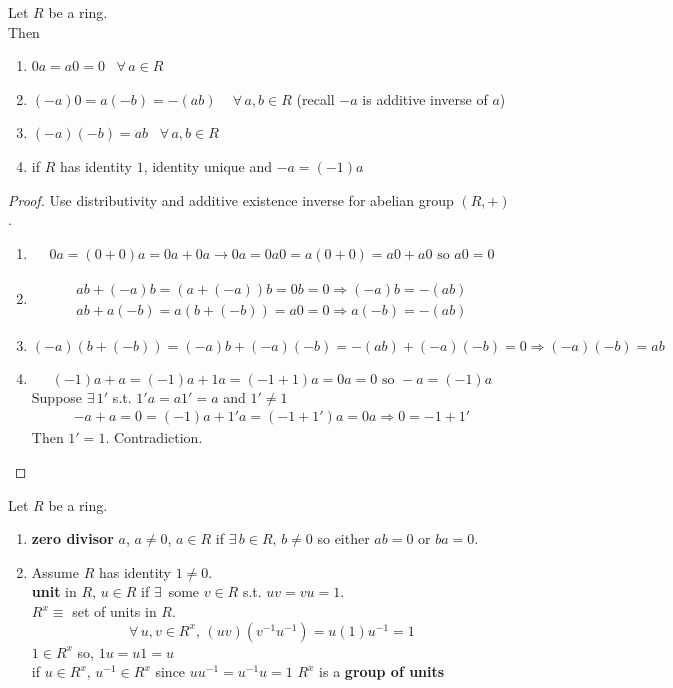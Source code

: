 \begin{proposition}
Let $R$ be a ring. \\
Then
\begin{enumerate}
	\item $0a = a0 = 0$ \, $\forall \, a \in R$ 
	\item $(-a) 0 = a(-b) = -(ab) \quad \, \forall \, a,b \in R$ (recall $-a$ is additive inverse of $a$)
	\item $(-a)(-b) =ab$ \quad \, $\forall \, a, b \in R$ 
	\item if $R$ has identity $1$, identity unique and $-a = (-1) a$
\end{enumerate}
\end{proposition}

\begin{proof}
Use distributivity and additive existence inverse for abelian group $(R, +)$. 

\begin{enumerate}
	\item \[
	\begin{gathered}
	0a = (0 + 0) a = 0a + 0a \to 0a = 0 
	a0 = a(0 + 0) = a0 + a0 \text{ so } a0 = 0 	
	\end{gathered}
	\]
	\item 
	\[
	\begin{gathered} 
	ab + (-a)b = (a + (-a)) b = 0b = 0 \Longrightarrow (-a) b = -(ab) \\
	ab + a(-b) = a(b + (-b)) = a0 = 0 \Longrightarrow a(-b) = -(ab) 	
	\end{gathered} 
	\]
	\item \[
	(-a)(b + (-b)) = (-a)b + (-a)(-b) = -(ab) + (-a)(-b) = 0 \Longrightarrow (-a)(-b) =ab
	\]
	\item \[
	(-1)a  + a = (-1) a + 1a = (-1 + 1) a = 0a = 0 \text{ so } -a = (-1) a
	\]
	Suppose $\exists \, 1'$ s.t. $1' a = a1' = a$ and $1' \neq 1$  
	\[
	\begin{gathered}
	-a + a = 0 = (-1) a + 1' a = (-1 + 1') a = 0 a \Longrightarrow 0 = -1 + 1' 
	\end{gathered}
	\]
	Then $1' = 1$. Contradiction. 
\end{enumerate}
\end{proof}

\begin{definition}
Let $R$ be a ring.
\begin{enumerate}
	\item \textbf{zero divisor} $a$, $a\neq 0$, $a\in R$ if $\exists \,  b\in R, \, b\neq 0$ so either $ab= 0$ or $ba=0$. 
	\item Assume $R$ has identity $1\neq 0$. \\
	\textbf{unit} in $R$, $u\in R$ if $\exists \,$ some $v\in R$ s.t. $uv = vu =1$. \\
	$R^x \equiv $ set of units in $R$. 
	\[
	\forall \, u,v \in R^x, \, (uv) (v^{-1}u^{-1}) = u(1)u^{-1} = 1
	\]
	$1 \in R^x$ so, $1u = u1 = u$ \\
	if $u\in R^x$, $u^{-1} \in R^x$ since $uu^{-1} = u^{-1} u =1$ 
$R^x$ is a \textbf{group of units}
\end{enumerate}	
\end{definition} 

